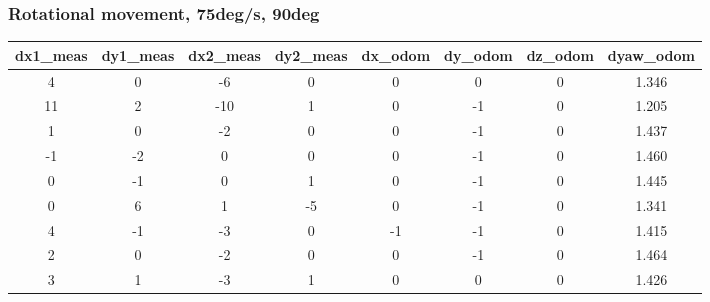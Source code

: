\documentclass[a4paper, 12pt]{article}
\begin{document}
    \subsubsection{Rotational movement, 75deg/s, 90deg}

    \begin{table}[H]
    \scriptsize
    \begin{tabular}{@{}cccccccc@{}}
    \toprule
    \textbf{dx1\_meas} & \textbf{dy1\_meas} & \textbf{dx2\_meas} & \textbf{dy2\_meas} & \textbf{dx\_odom} & \textbf{dy\_odom} & \textbf{dz\_odom} & \textbf{dyaw\_odom} \\ \midrule
    4                      & 0                      & -6                     & 0                      & 0                 & 0                 & 0                 & 1.346               \\
    11                     & 2                      & -10                    & 1                      & 0                 & -1                & 0                 & 1.205               \\
    1                      & 0                      & -2                     & 0                      & 0                 & -1                & 0                 & 1.437               \\
    -1                     & -2                     & 0                      & 0                      & 0                 & -1                & 0                 & 1.460               \\
    0                      & -1                     & 0                      & 1                      & 0                 & -1                & 0                 & 1.445               \\
    0                      & 6                      & 1                      & -5                     & 0                 & -1                & 0                 & 1.341               \\
    4                      & -1                     & -3                     & 0                      & -1                & -1                & 0                 & 1.415               \\
    2                      & 0                      & -2                     & 0                      & 0                 & -1                & 0                 & 1.464               \\
    3                      & 1                      & -3                     & 1                      & 0                 & 0                 & 0                 & 1.426               \\

\end{tabular}
\end{table}
\end{document}
